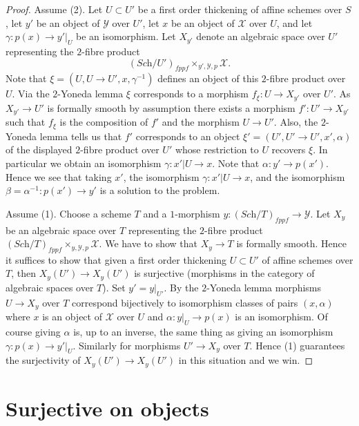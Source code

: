 \begin{proof}
Assume (2). Let $U \subset U'$ be a first order thickening
of affine schemes over $S$, let $y'$ be an object of $\mathcal{Y}$
over $U'$, let $x$ be an object of $\mathcal{X}$ over $U$,
and let $\gamma : p(x) \to y'|_U$ be an isomorphism. Let
$X_{y'}$ denote an algebraic space over $U'$ representing the $2$-fibre
product
$$
(\textit{Sch}/U')_{fppf} \times_{y', \mathcal{Y}, p} \mathcal{X}.
$$
Note that $\xi = (U, U \to U', x, \gamma^{-1})$ defines an object of
this $2$-fibre product over $U$. Via the $2$-Yoneda lemma $\xi$ corresponds
to a morphism $f_\xi : U \to X_{y'}$ over $U'$. As $X_{y'} \to U'$ is
formally smooth by assumption there exists a morphism
$f' : U' \to X_{y'}$ such that $f_\xi$ is the composition of $f'$
and the morphism $U \to U'$. Also, the $2$-Yoneda lemma tells us that
$f'$ corresponds to an object $\xi' = (U', U' \to U', x', \alpha)$ of
the displayed $2$-fibre product over $U'$ whose restriction to
$U$ recovers $\xi$. In particular we obtain an isomorphism
$\gamma : x'|U \to x$. Note that $\alpha : y' \to p(x')$.
Hence we see that taking $x'$, the isomorphism
$\gamma : x'|U \to x$, and the isomorphism
$\beta = \alpha^{-1} : p(x') \to y'$
is a solution to the problem.

\medskip\noindent
Assume (1). Choose a scheme $T$ and a $1$-morphism
$y : (\textit{Sch}/T)_{fppf} \to \mathcal{Y}$. Let
$X_y$ be an algebraic space over $T$ representing the $2$-fibre product
$(\textit{Sch}/T)_{fppf} \times_{y, \mathcal{Y}, p} \mathcal{X}$.
We have to show that $X_y \to T$ is formally smooth.
Hence it suffices to show that given a first order thickening
$U \subset U'$ of affine schemes over $T$, then
$X_y(U') \to X_y(U')$ is surjective (morphisms in the
category of algebraic spaces over $T$). Set $y' = y|_{U'}$.
By the $2$-Yoneda lemma morphisms $U \to X_y$ over $T$ correspond bijectively
to isomorphism classes of pairs $(x, \alpha)$ where $x$ is an object
of $\mathcal{X}$ over $U$ and $\alpha : y|_U \to p(x)$ is an isomorphism.
Of course giving $\alpha$ is, up to an inverse, the same thing as giving
an isomorphism $\gamma : p(x) \to y'|_U$.
Similarly for morphisms $U' \to X_y$ over $T$. Hence (1) guarantees
the surjectivity of $X_y(U') \to X_y(U')$
in this situation and we win.
\end{proof}







\section{Surjective on objects}
\label{section-formally-surjective}

